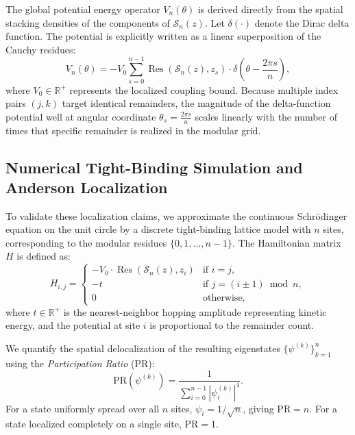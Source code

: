 \documentclass[11pt,twoside]{article}
\begin{document}
	The global potential energy operator $V_n(\theta)$ is derived directly from the spatial stacking densities of the components of $\mathcal{S}_n(z)$. Let $\delta(\cdot)$ denote the Dirac delta function. The potential is explicitly written as a linear superposition of the Cauchy residues:
	\begin{equation}
		V_n(\theta) = -V_0 \sum_{s=0}^{n-1} \operatorname{Res}(\mathcal{S}_n(z), z_s) \cdot \delta\left(\theta - \frac{2\pi s}{n}\right),
	\end{equation}
	where $V_0 \in \mathbb{R}^+$ represents the localized coupling bound. Because multiple index pairs $(j,k)$ target identical remainders, the magnitude of the delta-function potential well at angular coordinate $\theta_s = \frac{2\pi s}{n}$ scales linearly with the number of times that specific remainder is realized in the modular grid.
	
	\subsection{Numerical Tight-Binding Simulation and Anderson Localization}
	To validate these localization claims, we approximate the continuous Schrödinger equation on the unit circle by a discrete tight-binding lattice model with $n$ sites, corresponding to the modular residues $\{0, 1, \dots, n-1\}$. The Hamiltonian matrix $H$ is defined as:
	\begin{equation}
		H_{i,j} = \begin{cases}
			-V_0 \cdot \operatorname{Res}(\mathcal{S}_n(z), z_i) & \text{if } i = j, \\
			-t & \text{if } j = (i \pm 1) \bmod n, \\
			0 & \text{otherwise},
		\end{cases}
	\end{equation}
	where $t \in \mathbb{R}^+$ is the nearest-neighbor hopping amplitude representing kinetic energy, and the potential at site $i$ is proportional to the remainder count.
	
	We quantify the spatial delocalization of the resulting eigenstates $\{\psi^{(k)}\}_{k=1}^{n}$ using the \emph{Participation Ratio} (PR):
	\begin{equation}
		\text{PR}(\psi^{(k)}) = \frac{1}{\sum_{i=0}^{n-1} |\psi^{(k)}_i|^4}.
	\end{equation}
	For a state uniformly spread over all $n$ sites, $\psi_i = 1/\sqrt{n}$, giving $\text{PR} = n$. For a state localized completely on a single site, $\text{PR} = 1$.
	
\end{document}
